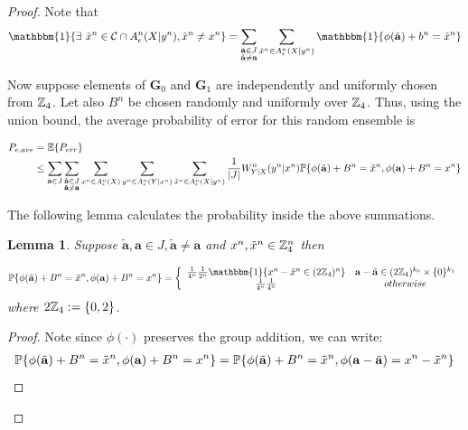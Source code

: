 \documentclass[conference]{IEEEtran}
\theoremstyle{plain}
\newtheorem{lem}{Lemma}
\theoremstyle{definition}
\theoremstyle{remark}
\begin{document}
\begin{proof}
Note that
\begin{align*}
\mathbbm{1}\{ \exists ~ \tilde{x}^n\in \mathcal{C} \cap A_\epsilon^n(X|y^n), \tilde{x}^n\neq x^n \}=\sum_{\substack{\tilde{\mathbf{a}} \in J \\\tilde{ \mathbf{a}}\neq \mathbf{a}}}\sum_{\tilde{x}^n\in A_\epsilon^n(X|y^n)}\mathbbm{1}\{ \phi(\tilde{\mathbf{a}})+b^n=\tilde{x}^n\}
\end{align*}

Now suppose elements of $\mathbf{G}_0$ and $ \mathbf{G}_1$ are independently and uniformly chosen from $\mathbb{Z}_4$. Let also $B^n$ be chosen randomly and uniformly over $\mathbb{Z}_4$. Thus, using the union bound, the average probability of error for this random ensemble is

\begin{align}\label{equ: p_err}
P_{e, ave}&=\mathbb{E}\{ P_{err} \}\\\nonumber
&\leq\sum_{\mathbf{a}\in J} \sum_{\substack{\tilde{\mathbf{a}} \in J \\\tilde{\mathbf{a}}\neq \mathbf{a}}} \sum_{x^n\in A_\epsilon^n(X)} \sum_{y^n\in A_\epsilon^n(Y|x^n)} \sum_{\tilde{x}^n\in A_\epsilon^n(X|y^n)} \frac{1}{|J|} W_{Y|X}^n(y^n|x^n) \mathbb{P}\{ \phi(\tilde{\mathbf{a}})+B^n=\tilde{x}^n, \phi(\mathbf{a})+B^n=x^n\}
\end{align}

The following lemma calculates the probability inside the above summations.

\begin{lem}\label{lem: probability of phi}
Suppose $\tilde{\mathbf{a}}, \mathbf{a} \in J, \tilde{\mathbf{a}} \neq \mathbf{a}$ and $x^n, \tilde{x}^n \in \mathbb{Z}_4^n$ then 

\begin{align*}
\PP\{ \phi(\tilde{\mathbf{a}})+B^n=\tilde{x}^n, \phi(\mathbf{a})+B^n=x^n\}=\left\{ \begin{array}{cc}
\frac{1}{4^n}\frac{1}{2^n}\mathbbm{1}\{x^n-\tilde{x}^n \in (2\ZZ_4)^n \} & \mathbf{a}-\tilde{\mathbf{a}}\in (2\ZZ_4)^{k_0}\times \{0\}^{k_1} \\ 
\frac{1}{4^n}\frac{1}{4^n} & otherwise
\end{array} 
\right.
\end{align*}
where $2\mathbb{Z}_4:=\{0,2\}$.
\end{lem}


\begin{proof}
Note since $\phi (\cdot)$ preserves the group addition, we can write:
\begin{align*}
\mathbb{P}\{ \phi(\tilde{\mathbf{a}})+B^n=\tilde{x}^n, \phi(\mathbf{a})+B^n=x^n\}=\mathbb{P}\{ \phi(\tilde{\mathbf{a}})+B^n=\tilde{x}^n, \phi(\mathbf{a}-\tilde{\mathbf{a}})=x^n-\tilde{x}^n\}
\end{align*}


\end{proof}
\end{proof}
\end{document}
